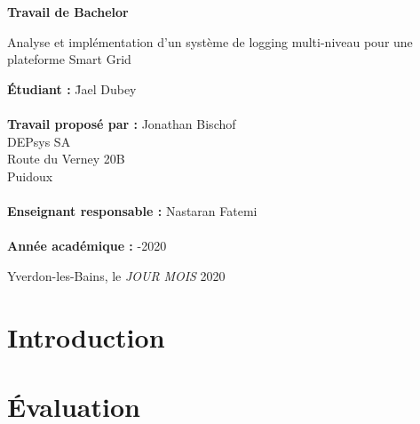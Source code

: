 \documentclass[paper=a4, fontsize=11pt]{scrartcl}
\begin{document}

\begin{titlepage}
  \thispagestyle{firstpage}
  \begin{center}
    \vspace*{5cm}
    
    \Huge
    \textbf{Travail de Bachelor}

    \vspace{1.5cm}
    \LARGE
    Analyse et implémentation d'un système de logging multi-niveau pour une plateforme Smart Grid
  \end{center}

  \vspace{6cm}
  \begin{tabbing}
    \linespread{3}\textbf{Étudiant :} \hspace{12em} \= Jael Dubey\\\\

    \textbf{Travail proposé par :} \> Jonathan Bischof\\
    \> DEPsys SA\\
    \> Route du Verney 20B\\
     Puidoux\\\\

    \textbf{Enseignant responsable :} \> Nastaran Fatemi\\\\

    \textbf{Année académique :} -2020
  \end{tabbing}

  \vspace{3cm}
  \begin{flushright}
    Yverdon-les-Bains, le \textit{JOUR} \textit{MOIS} 2020
  \end{flushright}
\end{titlepage}

\newpage
\renewcommand{\contentsname}{Table des matières}
\tableofcontents

\newpage
\section{Introduction}
\section{Évaluation}
\end{document}
